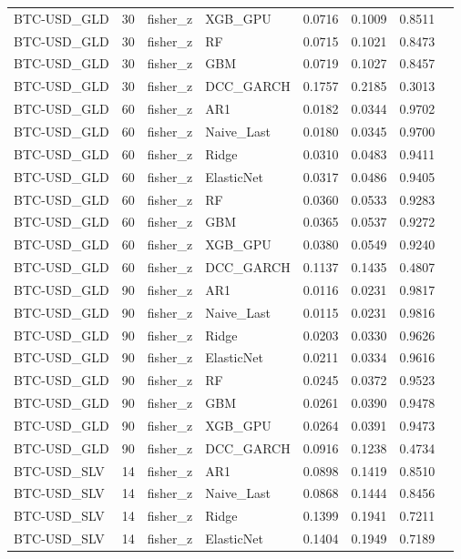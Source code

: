 \begin{table}[H]
\begin{tabular}{llllrrrr}
BTC-USD_GLD & 30 & fisher_z & XGB_GPU & 0.0716 & 0.1009 & 0.8511 &  \\
BTC-USD_GLD & 30 & fisher_z & RF & 0.0715 & 0.1021 & 0.8473 &  \\
BTC-USD_GLD & 30 & fisher_z & GBM & 0.0719 & 0.1027 & 0.8457 &  \\
BTC-USD_GLD & 30 & fisher_z & DCC_GARCH & 0.1757 & 0.2185 & 0.3013 &  \\
BTC-USD_GLD & 60 & fisher_z & AR1 & 0.0182 & 0.0344 & 0.9702 &  \\
BTC-USD_GLD & 60 & fisher_z & Naive_Last & 0.0180 & 0.0345 & 0.9700 &  \\
BTC-USD_GLD & 60 & fisher_z & Ridge & 0.0310 & 0.0483 & 0.9411 &  \\
BTC-USD_GLD & 60 & fisher_z & ElasticNet & 0.0317 & 0.0486 & 0.9405 &  \\
BTC-USD_GLD & 60 & fisher_z & RF & 0.0360 & 0.0533 & 0.9283 &  \\
BTC-USD_GLD & 60 & fisher_z & GBM & 0.0365 & 0.0537 & 0.9272 &  \\
BTC-USD_GLD & 60 & fisher_z & XGB_GPU & 0.0380 & 0.0549 & 0.9240 &  \\
BTC-USD_GLD & 60 & fisher_z & DCC_GARCH & 0.1137 & 0.1435 & 0.4807 &  \\
BTC-USD_GLD & 90 & fisher_z & AR1 & 0.0116 & 0.0231 & 0.9817 &  \\
BTC-USD_GLD & 90 & fisher_z & Naive_Last & 0.0115 & 0.0231 & 0.9816 &  \\
BTC-USD_GLD & 90 & fisher_z & Ridge & 0.0203 & 0.0330 & 0.9626 &  \\
BTC-USD_GLD & 90 & fisher_z & ElasticNet & 0.0211 & 0.0334 & 0.9616 &  \\
BTC-USD_GLD & 90 & fisher_z & RF & 0.0245 & 0.0372 & 0.9523 &  \\
BTC-USD_GLD & 90 & fisher_z & GBM & 0.0261 & 0.0390 & 0.9478 &  \\
BTC-USD_GLD & 90 & fisher_z & XGB_GPU & 0.0264 & 0.0391 & 0.9473 &  \\
BTC-USD_GLD & 90 & fisher_z & DCC_GARCH & 0.0916 & 0.1238 & 0.4734 &  \\
BTC-USD_SLV & 14 & fisher_z & AR1 & 0.0898 & 0.1419 & 0.8510 &  \\
BTC-USD_SLV & 14 & fisher_z & Naive_Last & 0.0868 & 0.1444 & 0.8456 &  \\
BTC-USD_SLV & 14 & fisher_z & Ridge & 0.1399 & 0.1941 & 0.7211 &  \\
BTC-USD_SLV & 14 & fisher_z & ElasticNet & 0.1404 & 0.1949 & 0.7189 &  \\

\end{tabular}
\end{table}

